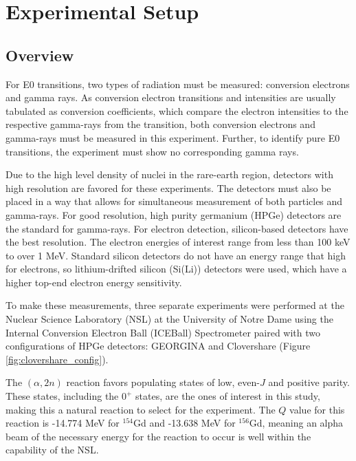 %
%

\chapter{Experimental Setup}
\label{chap:setup}

\section{Overview}

For E0 transitions, two types of radiation must be measured: conversion electrons and gamma rays. As conversion electron transitions and intensities are usually tabulated as conversion coefficients, which compare the electron intensities to the respective gamma-rays from the transition, both conversion electrons and gamma-rays must be measured in this experiment. Further, to identify pure E0 transitions, the experiment must show no corresponding gamma rays.

Due to the high level density of nuclei in the rare-earth region, detectors with high resolution are favored for these experiments. The detectors must also be placed in a way that allows for simultaneous measurement of both particles and gamma-rays. For good resolution, high purity germanium (HPGe) detectors are the standard for gamma-rays. For electron detection, silicon-based detectors have the best resolution. The electron energies of interest range from less than 100 keV to over 1 MeV. Standard silicon detectors do not have an energy range that high for electrons, so lithium-drifted silicon (Si(Li)) detectors were used, which have a higher top-end electron energy sensitivity.

To make these measurements, three separate experiments were performed at the Nuclear Science Laboratory (NSL) at the University of Notre Dame using the Internal Conversion Electron Ball (ICEBall) Spectrometer paired with two configurations of HPGe detectors: GEORGINA and Clovershare (Figure \ref{fig:clovershare_config}). 

%



The $(\alpha,2n)$ reaction favors populating states of low, even-$J$ and positive parity. These states, including the $0^+$ states, are the ones of interest in this study, making this a natural reaction to select for the experiment. The $Q$ value for this reaction is -14.774 MeV for $^{154}$Gd and -13.638 MeV for $^{156}$Gd, meaning an alpha beam of the necessary energy for the reaction to occur is well within the capability of the NSL.

